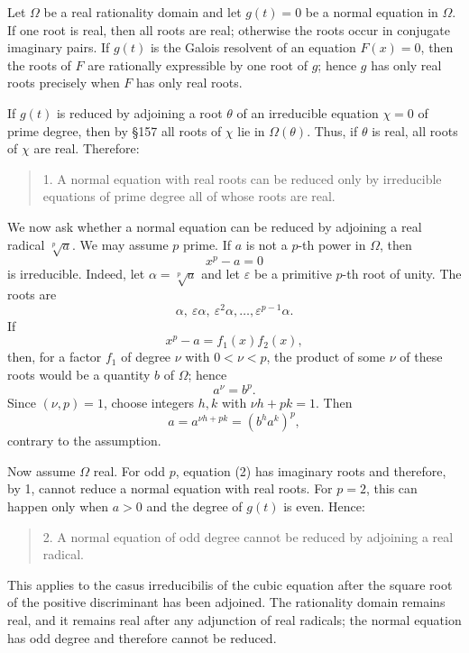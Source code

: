 \documentclass[11pt]{article}
\begin{document}
Let $\Omega$ be a real rationality domain and let $g(t)=0$ be a normal equation in $\Omega$. If one root is real, then all roots are real; otherwise the roots occur in conjugate imaginary pairs. If $g(t)$ is the Galois resolvent of an equation $F(x)=0$, then the roots of $F$ are rationally expressible by one root of $g$; hence $g$ has only real roots precisely when $F$ has only real roots.

If $g(t)$ is reduced by adjoining a root $\theta$ of an irreducible equation $\chi=0$ of prime degree, then by §157 all roots of $\chi$ lie in $\Omega(\theta)$. Thus, if $\theta$ is real, all roots of $\chi$ are real. Therefore:
\begin{quote}
1. A normal equation with real roots can be reduced only by irreducible equations of prime degree all of whose roots are real.
\end{quote}

We now ask whether a normal equation can be reduced by adjoining a real radical $\sqrt[p]{a}$. We may assume $p$ prime. If $a$ is not a $p$-th power in $\Omega$, then
\[
  x^p-a=0                                                        \tag{2}
\]
is irreducible. Indeed, let $\alpha=\sqrt[p]{a}$ and let $\varepsilon$ be a primitive $p$-th root of unity. The roots are
\[
  \alpha,\ \varepsilon\alpha,\ \varepsilon^2\alpha,\ldots,\varepsilon^{p-1}\alpha. \tag{1}
\]
If
\[
  x^p-a=f_1(x)f_2(x),                                           \tag{3}
\]
then, for a factor $f_1$ of degree $\nu$ with $0<\nu<p$, the product of some $\nu$ of these roots would be a quantity $b$ of $\Omega$; hence
\[
  a^\nu=b^p.                                                    \tag{4}
\]
Since $(\nu,p)=1$, choose integers $h,k$ with $\nu h+pk=1$. Then
\[
  a=a^{\nu h+pk}=(b^h a^k)^p,
\]
contrary to the assumption.

Now assume $\Omega$ real. For odd $p$, equation (2) has imaginary roots and therefore, by 1, cannot reduce a normal equation with real roots. For $p=2$, this can happen only when $a>0$ and the degree of $g(t)$ is even. Hence:
\begin{quote}
2. A normal equation of odd degree cannot be reduced by adjoining a real radical.
\end{quote}

This applies to the casus irreducibilis of the cubic equation after the square root of the positive discriminant has been adjoined. The rationality domain remains real, and it remains real after any adjunction of real radicals; the normal equation has odd degree and therefore cannot be reduced.
\end{document}
